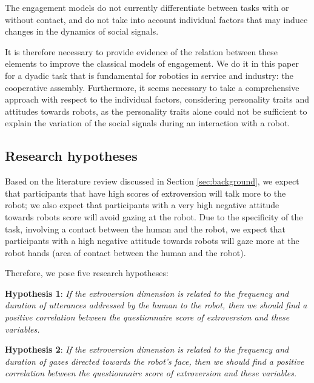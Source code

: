 \documentclass[twocolumn]{svjour3}          %
\newcommand{\todo}[1]{\color{red} { \bf TODO: #1 } \normalcolor}
\begin{document}
The engagement models do not currently differentiate between tasks with or without contact, and do not take into account individual factors that may induce changes in the dynamics of social signals.

It is therefore necessary to provide evidence of the relation between these elements to improve the classical models of engagement. We do it in this paper for a dyadic task that is fundamental for robotics in service and industry: the cooperative assembly.
Furthermore, it seems necessary to take a comprehensive approach with respect to the individual factors, considering personality traits and attitudes towards robots, as the personality traits alone could not be sufficient to explain the variation of the social signals during an interaction with a robot.



\subsection{Research hypotheses}\label{sec:hypotheses}

Based on the literature review discussed in Section \ref{sec:background}, we expect that participants that have high scores of extroversion will talk more to the robot; we also expect that participants with a very high negative attitude towards robots score will avoid gazing at the robot. 
Due to the specificity of the task, involving a contact between the human and the robot, we expect that participants with a high negative attitude towards robots will gaze more at the robot hands (area of contact between the human and the robot).

Therefore, we pose five research hypotheses:

\medskip
\textbf{Hypothesis 1}: 
\textit{If the extroversion dimension is related to the frequency and duration of utterances addressed by the human to the robot, then we should find a positive correlation between the questionnaire score of extroversion and these variables.}

\textbf{Hypothesis 2}: 
\textit{If the extroversion dimension is related to  the frequency and duration of gazes directed towards the robot's face, then we should find a positive correlation between the questionnaire score of extroversion and these variables. }
\end{document}
